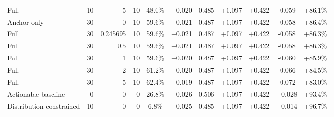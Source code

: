 \begin{table}[htbp]
\begin{tabular}{lrrrccccccc}
Full & 10 & 5 & 10 & 48.0\% & +0.020 & 0.485 & +0.097 & +0.422 & -0.059 & +86.1\% \\
Anchor only & 30 & 0 & 10 & 59.6\% & +0.021 & 0.487 & +0.097 & +0.422 & -0.058 & +86.4\% \\
Full & 30 & 0.245695 & 10 & 59.6\% & +0.021 & 0.487 & +0.097 & +0.422 & -0.058 & +86.3\% \\
Full & 30 & 0.5 & 10 & 59.6\% & +0.021 & 0.487 & +0.097 & +0.422 & -0.058 & +86.3\% \\
Full & 30 & 1 & 10 & 59.6\% & +0.020 & 0.487 & +0.097 & +0.422 & -0.060 & +85.9\% \\
Full & 30 & 2 & 10 & 61.2\% & +0.020 & 0.487 & +0.097 & +0.422 & -0.066 & +84.5\% \\
Full & 30 & 5 & 10 & 62.4\% & +0.019 & 0.487 & +0.097 & +0.422 & -0.072 & +83.0\% \\
Actionable baseline & 0 & 0 & 0 & 26.8\% & +0.026 & 0.506 & +0.097 & +0.422 & +0.028 & +93.4\% \\
Distribution constrained & 10 & 0 & 0 & 6.8\% & +0.025 & 0.485 & +0.097 & +0.422 & +0.014 & +96.7\% \\
\bottomrule
\end{tabular}
\end{table}
